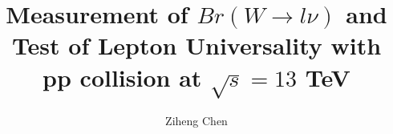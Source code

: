 \documentclass[12pt,reqno]{nuthesis}
\author{Ziheng Chen}
\title{Measurement of $Br(W\to l \nu)$ and Test of Lepton Universality with pp collision at $\sqrt{s}=13$ TeV}
\begin{document}
    
    
    


    \mainmatter  
    
    
    
    
    
    
    
    
    
    
    
    \begin{appendix}
    
    \end{appendix}


    \begin{singlespace}
    
    
    \end{singlespace}
    
    
    
\end{document}
